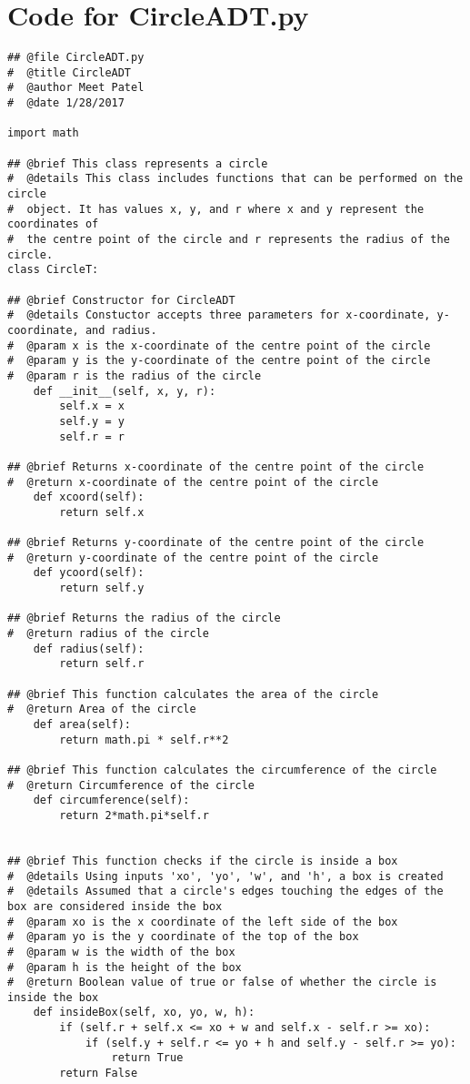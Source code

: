 \documentclass[12pt]{article}
\begin{document}
\section{Code for CircleADT.py} \label{MyCircleSect}
\begin{lstlisting}
## @file CircleADT.py
#  @title CircleADT
#  @author Meet Patel
#  @date 1/28/2017

import math

## @brief This class represents a circle
#  @details This class includes functions that can be performed on the circle
#  object. It has values x, y, and r where x and y represent the coordinates of
#  the centre point of the circle and r represents the radius of the circle.
class CircleT:

## @brief Constructor for CircleADT
#  @details Constuctor accepts three parameters for x-coordinate, y-coordinate, and radius.
#  @param x is the x-coordinate of the centre point of the circle
#  @param y is the y-coordinate of the centre point of the circle
#  @param r is the radius of the circle
    def __init__(self, x, y, r):
        self.x = x
        self.y = y
        self.r = r

## @brief Returns x-coordinate of the centre point of the circle
#  @return x-coordinate of the centre point of the circle
    def xcoord(self):
        return self.x

## @brief Returns y-coordinate of the centre point of the circle
#  @return y-coordinate of the centre point of the circle
    def ycoord(self):
        return self.y

## @brief Returns the radius of the circle
#  @return radius of the circle
    def radius(self):
        return self.r
    
## @brief This function calculates the area of the circle
#  @return Area of the circle
    def area(self):
        return math.pi * self.r**2

## @brief This function calculates the circumference of the circle
#  @return Circumference of the circle
    def circumference(self):
        return 2*math.pi*self.r


## @brief This function checks if the circle is inside a box
#  @details Using inputs 'xo', 'yo', 'w', and 'h', a box is created
#  @details Assumed that a circle's edges touching the edges of the box are considered inside the box
#  @param xo is the x coordinate of the left side of the box
#  @param yo is the y coordinate of the top of the box
#  @param w is the width of the box
#  @param h is the height of the box
#  @return Boolean value of true or false of whether the circle is inside the box
    def insideBox(self, xo, yo, w, h):
        if (self.r + self.x <= xo + w and self.x - self.r >= xo):
            if (self.y + self.r <= yo + h and self.y - self.r >= yo):
                return True
        return False


\end{lstlisting}
\end{document}
